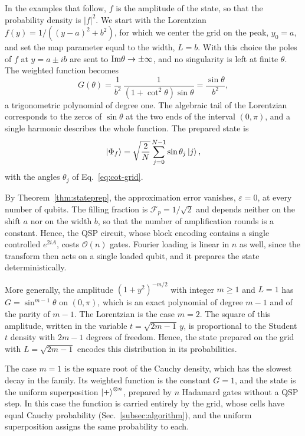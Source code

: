 In the examples that follow, $f$ is the amplitude of the state, so
that the probability density is $|f|^2$.  We start with the
Lorentzian $f(y)=1/((y-a)^2+b^2)$, for which we center the grid on
the peak, $y_0=a$, and set the map parameter equal to the width,
$L=b$.  With this choice the poles of $f$ at $y=a\pm ib$ are sent
to $\mathrm{Im}\theta\to\pm\infty$, and no singularity is left at finite
$\theta$.  The weighted function becomes
\begin{equation}
	G(\theta)=\frac{1}{b^2}\,\frac{1}{(1+\cot^2\theta)\sin\theta}
	=\frac{\sin\theta}{b^2},
\end{equation}
a trigonometric polynomial of degree one.  The algebraic tail of
the Lorentzian corresponds to the zeros of $\sin\theta$ at the two
ends of the interval $(0,\pi)$, and a single harmonic describes
the whole function.  The prepared state is
\begin{equation}
	\ket{\Phi_f}=\sqrt{\frac{2}{N}}\sum_{j=0}^{N-1}
	\sin\theta_j\ket{j},
	\label{eq:lorentzian-state}
\end{equation}
with the angles $\theta_j$ of Eq.~\eqref{eq:cot-grid}.

By Theorem~\ref{thm:stateprep}, the approximation error vanishes,
$\varepsilon=0$, at every number of qubits.  The filling fraction
is $\mathcal{F}_p=1/\sqrt2$ and depends neither on the shift $a$
nor on the width $b$, so that the number of amplification rounds
is a constant.  Hence, the QSP circuit, whose block encoding
contains a single controlled $e^{2iA}$, costs $\mathcal{O}(n)$
gates.  Fourier loading is linear in $n$ as well, since the
transform then acts on a single loaded qubit, and it prepares the
state deterministically.

More generally, the amplitude $(1+y^2)^{-m/2}$ with integer
$m\ge1$ and $L=1$ has $G=\sin^{m-1}\theta$ on $(0,\pi)$, which is
an exact polynomial of degree $m-1$ and of the parity of $m-1$.
The Lorentzian is the case $m=2$.  The square of this amplitude,
written in the variable $t=\sqrt{2m-1}\,y$, is proportional to the
Student $t$ density with $2m-1$ degrees of freedom.  Hence, the
state prepared on the grid with $L=\sqrt{2m-1}$ encodes this
distribution in its probabilities.

The case $m=1$ is the square root of the Cauchy density, which has
the slowest decay in the family.  Its weighted function is the
constant $G=1$, and the state is the uniform superposition
$\ket{+}^{\otimes n}$, prepared by $n$ Hadamard gates without a
QSP step.  In this case the function is carried entirely by the
grid, whose cells have equal Cauchy probability
(Sec.~\ref{subsec:algorithm}), and the uniform superposition
assigns the same probability to each.


